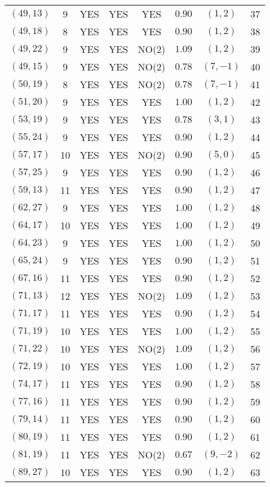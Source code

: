 \begin{longtable}{|c|c|c|c|c|c|c|c|}
$(49,13)$ & 9 & YES & YES & YES & $0.90$ & $(1,2)$ & 37\\
$(49,18)$ & 8 & YES & YES & YES & $0.90$ & $(1,2)$ & 38\\
$(49,22)$ & 9 & YES & YES & NO(2) & $1.09$ & $(1,2)$ & 39\\
$(49,15)$ & 9 & YES & YES & NO(2) & $0.78$ & $(7,-1)$ & 40\\
$(50,19)$ & 8 & YES & YES & NO(2) & $0.78$ & $(7,-1)$ & 41\\
$(51,20)$ & 9 & YES & YES & YES & $1.00$ & $(1,2)$ & 42\\
$(53,19)$ & 9 & YES & YES & YES & $0.78$ & $(3,1)$ & 43\\
$(55,24)$ & 9 & YES & YES & YES & $0.90$ & $(1,2)$ & 44\\
$(57,17)$ & 10 & YES & YES & NO(2) & $0.90$ & $(5,0)$ & 45\\
$(57,25)$ & 9 & YES & YES & YES & $0.90$ & $(1,2)$ & 46\\
$(59,13)$ & 11 & YES & YES & YES & $0.90$ & $(1,2)$ & 47\\
$(62,27)$ & 9 & YES & YES & YES & $1.00$ & $(1,2)$ & 48\\
$(64,17)$ & 10 & YES & YES & YES & $1.00$ & $(1,2)$ & 49\\
$(64,23)$ & 9 & YES & YES & YES & $1.00$ & $(1,2)$ & 50\\
$(65,24)$ & 9 & YES & YES & YES & $0.90$ & $(1,2)$ & 51\\
$(67,16)$ & 11 & YES & YES & YES & $0.90$ & $(1,2)$ & 52\\
$(71,13)$ & 12 & YES & YES & NO(2) & $1.09$ & $(1,2)$ & 53\\
$(71,17)$ & 11 & YES & YES & YES & $0.90$ & $(1,2)$ & 54\\
$(71,19)$ & 10 & YES & YES & YES & $1.00$ & $(1,2)$ & 55\\
$(71,22)$ & 10 & YES & YES & NO(2) & $1.09$ & $(1,2)$ & 56\\
$(72,19)$ & 10 & YES & YES & YES & $1.00$ & $(1,2)$ & 57\\
$(74,17)$ & 11 & YES & YES & YES & $0.90$ & $(1,2)$ & 58\\
$(77,16)$ & 11 & YES & YES & YES & $0.90$ & $(1,2)$ & 59\\
$(79,14)$ & 11 & YES & YES & YES & $0.90$ & $(1,2)$ & 60\\
$(80,19)$ & 11 & YES & YES & YES & $0.90$ & $(1,2)$ & 61\\
$(81,19)$ & 11 & YES & YES & NO(2) & $0.67$ & $(9,-2)$ & 62\\
$(89,27)$ & 10 & YES & YES & YES & $0.90$ & $(1,2)$ & 63\\

\end{longtable}
